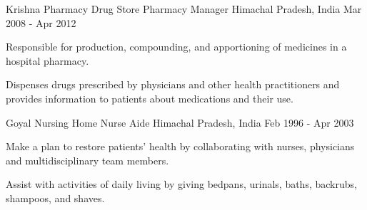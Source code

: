 \begin{cventries}
    \cventry
    {Krishna Pharmacy Drug Store} %
    {Pharmacy Manager} %
    {Himachal Pradesh, India} %
    {Mar 2008 - Apr 2012} %
    {
      \begin{cvitems} %
        \item {Responsible for production, compounding, and apportioning of medicines in a hospital pharmacy.}
        \item {Dispenses drugs prescribed by physicians and other health practitioners and provides information to patients about medications and their use.}
      \end{cvitems}
    }
    \cventry
    {Goyal Nursing Home} %
    {Nurse Aide} %
    {Himachal Pradesh, India} %
    {Feb 1996 - Apr 2003} %
    {
      \begin{cvitems} %
        \item {Make a plan to restore patients' health by collaborating with nurses, physicians and multidisciplinary team members.}
        \item{Assist with activities of daily living by giving bedpans, urinals, baths, backrubs, shampoos, and shaves.}
      \end{cvitems}
    }

\end{cventries}
